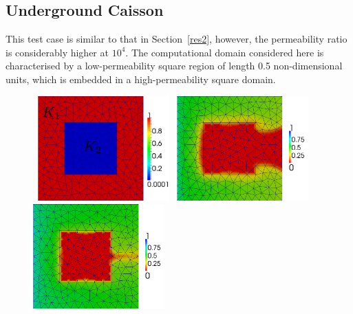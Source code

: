 \documentclass[preprint,authoryear,12pt]{elsarticle}
\begin{document}
\subsection{Underground Caisson}\label{res3}

This test case is similar to that in Section~\ref{res2}, however, the
permeability ratio is considerably higher at $10^4$. The computational
domain considered here is characterised by a low-permeability square
region of length 0.5 non-dimensional units, which is embedded in a
high-permeability square domain.

\begin{figure}[h!]
  \vbox{
    \hbox{
      \hspace{3.5cm} \includegraphics[width=0.45\textwidth]{square_permeability_lowv2}}
    \vspace{0.25cm}
    \hbox{
      \hspace{0.4cm}\includegraphics[width=0.45\textwidth]{cg_square_015_low}
      \hspace{0.4cm}\includegraphics[width=0.45\textwidth]{cg_square_05_low}}
    \vspace{0.25cm}
}
\end{figure}
\end{document}
